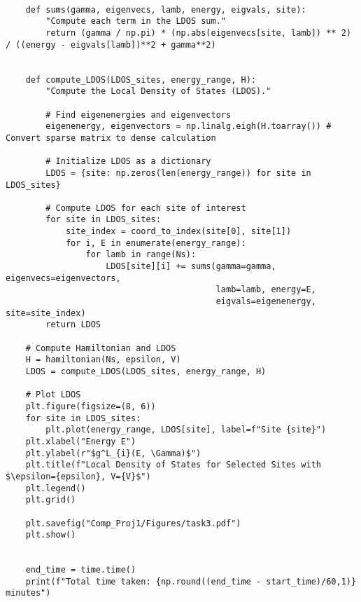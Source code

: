 \begin{verbatim}
    
    def sums(gamma, eigenvecs, lamb, energy, eigvals, site):
        "Compute each term in the LDOS sum."
        return (gamma / np.pi) * (np.abs(eigenvecs[site, lamb]) ** 2) / ((energy - eigvals[lamb])**2 + gamma**2)
    
    
    def compute_LDOS(LDOS_sites, energy_range, H):
        "Compute the Local Density of States (LDOS)."
    
        # Find eigenenergies and eigenvectors
        eigenenergy, eigenvectors = np.linalg.eigh(H.toarray()) # Convert sparse matrix to dense calculation
        
        # Initialize LDOS as a dictionary
        LDOS = {site: np.zeros(len(energy_range)) for site in LDOS_sites}
        
        # Compute LDOS for each site of interest
        for site in LDOS_sites:
            site_index = coord_to_index(site[0], site[1])
            for i, E in enumerate(energy_range):
                for lamb in range(Ns):
                    LDOS[site][i] += sums(gamma=gamma, eigenvecs=eigenvectors, 
                                          lamb=lamb, energy=E, 
                                          eigvals=eigenenergy, site=site_index)
        return LDOS 
    
    # Compute Hamiltonian and LDOS
    H = hamiltonian(Ns, epsilon, V)
    LDOS = compute_LDOS(LDOS_sites, energy_range, H)
    
    # Plot LDOS
    plt.figure(figsize=(8, 6))
    for site in LDOS_sites:
        plt.plot(energy_range, LDOS[site], label=f"Site {site}")
    plt.xlabel("Energy E")
    plt.ylabel(r"$g^L_{i}(E, \Gamma)$")
    plt.title(f"Local Density of States for Selected Sites with $\epsilon={epsilon}, V={V}$")
    plt.legend()
    plt.grid()
    
    plt.savefig("Comp_Proj1/Figures/task3.pdf")
    plt.show()
    
    
    end_time = time.time()
    print(f"Total time taken: {np.round((end_time - start_time)/60,1)} minutes")    
\end{verbatim}

